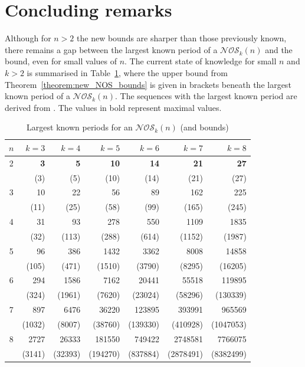 \documentclass[a4paper,11pt]{article}
\theoremstyle{plain}
\theoremstyle{definition}
\theoremstyle{remark}
\begin{document}
\section{Concluding remarks}  \label{section:conclusions}

Although for $n>2$ the new bounds are sharper than those previously known, there remains a gap
between the largest known period of a $\mathcal{NOS}_k(n)$ and the bound, even for small values of
$n$. The current state of knowledge for small $n$ and $k>2$ is summarised in
Table~\ref{table:largest_NOS_periods}, where the upper bound from
Theorem~\ref{theorem:new_NOS_bounds} is given in brackets beneath the largest known period of a
$\mathcal{NOS}_k(n)$. The sequences with the largest known period are derived from \cite[Lemma
3.9]{Mitchell25a}. The values in bold represent maximal values.

\begin{table}[htb]
\centering \caption{Largest known periods for an $\mathcal{NOS}_k(n)$ (and bounds)}
\label{table:largest_NOS_periods}

\begin{tabular}{crrrrrr} \hline
$n$ & $k=3$   & $k=4$    & $k=5$    & $k=6$    & $k=7$     & $k=8$     \\ \hline
2   & {\bf 3} & {\bf 5}  & {\bf 10} & {\bf 14} & {\bf 21}  & {\bf 27}  \\
    & (3)     & (5)      & (10)     & (14)     & (21)      & (27)      \\ \hline
3   & 10      & 22       & 56       & 89       & 162       & 225       \\
    & (11)    & (25)     & (58)     & (99)     & (165)     & (245)     \\ \hline
4   & 31      & 93       & 278      & 550      & 1109      & 1835      \\
    & (32)    & (113)    & (288)    & (614)    & (1152)    & (1987)    \\ \hline
5   & 96      & 386      & 1432     & 3362     & 8008      & 14858     \\
    & (105)   & (471)    & (1510)   & (3790)   & (8295)    & (16205)   \\ \hline
6   & 294     & 1586     & 7162     & 20441    & 55518     & 119895    \\
    & (324)   & (1961)   & (7620)   & (23024)  & (58296)   & (130339)  \\ \hline
7   & 897     & 6476     & 36220    & 123895   & 393991    & 965569    \\
    & (1032)  & (8007)   & (38760)  & (139330) & (410928)  & (1047053) \\ \hline
8   & 2727    & 26333    & 181550   & 749422   & 2748581   & 7766075   \\
    & (3141)  & (32393)  & (194270) & (837884) & (2878491) & (8382499) \\ \hline
\end{tabular}
\end{table}
\end{document}
